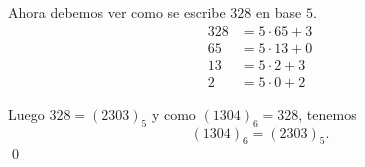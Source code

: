 \documentclass{beamer}
\begin{document}
\begin{frame}

Ahora debemos ver como se escribe $328$  en base $5$.
\begin{align*}
328 &= 5 \cdot 65   + 3\\ 
65 &= 5 \cdot 13   + 0\\ 
13 &= 5 \cdot 2   + 3\\ 
2 &= 5 \cdot 0   + 2
\end{align*}

Luego  $328 = (2303)_5$ y como $(1304)_6 = 328$, tenemos  
$$(1304)_6 = (2303)_5.$$ \qed

\vskip 3cm
\end{frame}
\end{document}
